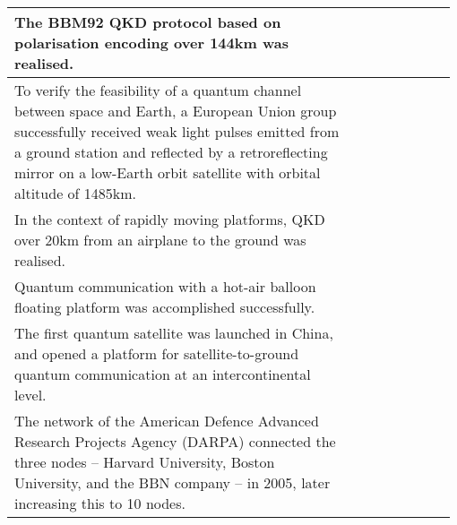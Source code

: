\begin{table*}[!htbp]
\begin{tabular}{|p{0.755\linewidth}|p{0.22\linewidth}|}
	\hline
	The BBM92 QKD protocol based on polarisation encoding over 144km was realised. & \cite{bib:NP_3_481}\\
	\hline
	To verify the feasibility of a quantum channel between space and Earth, a European Union group successfully received weak light pulses emitted from a ground station and reflected by a retroreflecting mirror on a low-Earth orbit satellite with orbital altitude of 1485km. & \cite{bib:NJP_10_033038}\\
	\hline
	In the context of rapidly moving platforms, QKD over 20km from an airplane to the ground was realised. & \cite{bib:NP_7_382}\\
	\hline
	Quantum communication with a hot-air balloon floating platform was accomplished successfully. & \cite{bib:NP_7_387}\\
	\hline
	The first quantum satellite was launched in China, and opened a platform for satellite-to-ground quantum communication at an intercontinental level.  & \cite{bib:gibney2016one, bib:liao2017satellite, bib:yin2017satellite}\\
	\hline
The network of the American Defence Advanced Research Projects Agency (DARPA) connected the three nodes -- Harvard University, Boston University, and the BBN company -- in 2005, later increasing this to 10 nodes. & \cite{bib:QCC_2006_83}\\

\end{tabular}
\end{table*}

